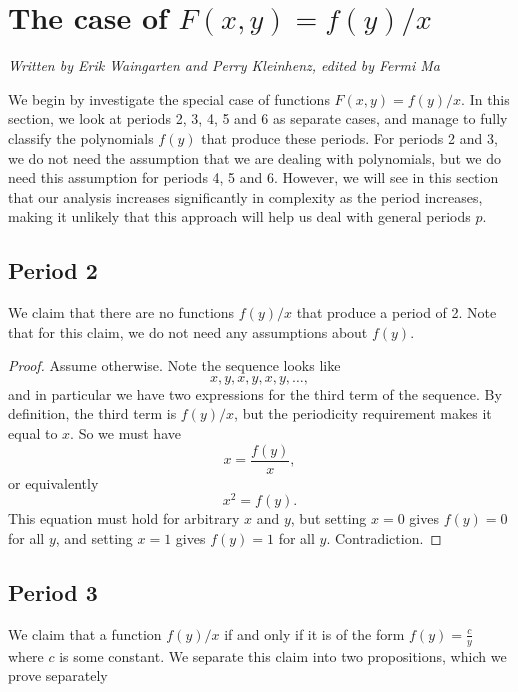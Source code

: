 \documentclass[12pt]{article}
\begin{document}
\section{The case of $F(x,y) = f(y)/x$}
\label{f(y)/x case}
\emph{Written by Erik Waingarten and Perry Kleinhenz, edited by Fermi Ma}

We begin by investigate the special case of functions $F(x,y) = f(y)/x$. In this section, we look at periods 2, 3, 4, 5 and 6 as separate cases, and manage to fully classify the polynomials $f(y)$ that produce these periods. For periods 2 and 3, we do not need the assumption that we are dealing with polynomials, but we do need this assumption for periods 4, 5 and 6. However, we will see in this section that our analysis increases significantly in complexity as the period increases, making it unlikely that this approach will help us deal with general periods $p$.

\subsection{Period 2}

We claim that there are no functions $f(y)/x$ that produce a period of 2. Note that for this claim, we do not need any assumptions about $f(y)$.

\begin{proof}
Assume otherwise. Note the sequence looks like
\[ x,y,x,y,x,y,\dots , \]
and in particular we have two expressions for the third term of the sequence. By definition, the third term is $f(y)/x$, but the periodicity requirement makes it equal to $x$. So we must have
\begin{equation*}
x = \frac{f(y)}{x},
\end{equation*}
or equivalently
\begin{equation*}
x^2 = f(y).
\end{equation*}
This equation must hold for arbitrary $x$ and $y$, but setting $x = 0$ gives $f(y) = 0$ for all $y$, and setting $x = 1$ gives $f(y) = 1$ for all $y$. Contradiction.
\end{proof}

\subsection{Period 3}

We claim that a function $f(y)/x$ if and only if it is of the form $f(y) = \frac{c}{y}$ where $c$ is some constant. We separate this claim into two propositions, which we prove separately
\end{document}
